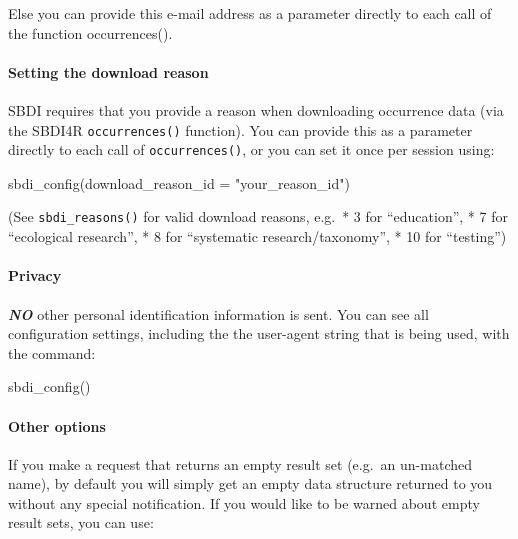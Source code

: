 \documentclass[
  10pt,
]{article}
\newenvironment{Shaded}{\begin{snugshade}}{\end{snugshade}}
\newcommand{\AttributeTok}[1]{\textcolor[rgb]{0.77,0.63,0.00}{#1}}
\newcommand{\FunctionTok}[1]{\textcolor[rgb]{0.00,0.00,0.00}{#1}}
\newcommand{\NormalTok}[1]{#1}
\newcommand{\StringTok}[1]{\textcolor[rgb]{0.31,0.60,0.02}{#1}}
\begin{document}
Else you can provide this e-mail address as a parameter directly to each call of the function occurrences().

\hypertarget{setting-the-download-reason}{%
\paragraph*{Setting the download reason}\label{setting-the-download-reason}}

SBDI requires that you provide a reason when downloading occurrence data (via the SBDI4R \texttt{occurrences()} function). You can provide this as a parameter directly to each call of \texttt{occurrences()}, or you can set it once per session using:

\begin{Shaded}
\begin{Highlighting}[]
\FunctionTok{sbdi\_config}\NormalTok{(}\AttributeTok{download\_reason\_id =} \StringTok{"your\_reason\_id"}\NormalTok{)}
\end{Highlighting}
\end{Shaded}

(See \texttt{sbdi\_reasons()} for valid download reasons, e.g.~* 3 for ``education'', * 7 for ``ecological research'', * 8 for ``systematic research/taxonomy'', * 10 for ``testing'')

\hypertarget{privacy}{%
\paragraph{Privacy}\label{privacy}}

\textbf{\emph{NO}} other personal identification information is sent. You can see all configuration settings, including the the user-agent string that is being used, with the command:

\begin{Shaded}
\begin{Highlighting}[]
\FunctionTok{sbdi\_config}\NormalTok{()}
\end{Highlighting}
\end{Shaded}

\hypertarget{other-options}{%
\paragraph*{Other options}\label{other-options}}

If you make a request that returns an empty result set (e.g.~an un-matched name), by default you will simply get an empty data structure returned to you without any special notification. If you would like to be warned about empty result sets, you can use:
\end{document}
